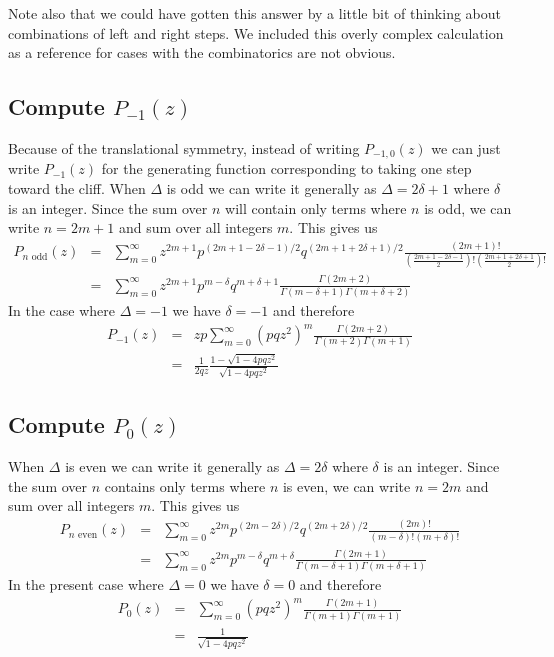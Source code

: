 \documentclass{article}
\begin{document}
Note also that we could have gotten this answer by a little bit of thinking about combinations of left and right steps. We included this overly complex calculation as a reference for cases with the combinatorics are not obvious.

\subsection{Compute $P_{-1}(z)$}

Because of the translational symmetry, instead of writing $P_{-1,0}(z)$ we can just write $P_{-1}(z)$ for the generating function corresponding to taking one step toward the cliff. When $\Delta$ is odd we can write it generally as $\Delta=2\delta+1$ where $\delta$ is an integer. Since the sum over $n$ will contain only terms where $n$ is odd, we can write $n=2m+1$ and sum over all integers $m$. This gives us\begin{eqnarray*}
P_{n\textrm{ odd}}(z) & = & \sum_{m=0}^{\infty}z^{2m+1}p^{(2m+1-2\delta-1)/2}q^{(2m+1+2\delta+1)/2}\frac{(2m+1)!}{\left(\frac{2m+1-2\delta-1}{2}\right)!\left(\frac{2m+1+2\delta+1}{2}\right)!}\\
 & = & \sum_{m=0}^{\infty}z^{2m+1}p^{m-\delta}q^{m+\delta+1}\frac{\Gamma(2m+2)}{\Gamma(m-\delta+1)\Gamma(m+\delta+2)}\end{eqnarray*}
In the case where $\Delta=-1$ we have $\delta=-1$ and therefore\begin{eqnarray*}
P_{-1}(z) & = & zp\sum_{m=0}^{\infty}\left(pqz^{2}\right)^{m}\frac{\Gamma(2m+2)}{\Gamma(m+2)\Gamma(m+1)}\\
 & = & \frac{1}{2qz}\frac{1-\sqrt{1-4pqz^{2}}}{\sqrt{1-4pqz^{2}}}\end{eqnarray*}

\subsection{Compute $P_{0}(z)$}

When $\Delta$ is even we can write it generally as $\Delta=2\delta$
where $\delta$ is an integer. Since the sum over $n$ contains only
terms where $n$ is even, we can write $n=2m$ and sum over all integers
$m$. This gives us\begin{eqnarray*}
P_{n\textrm{ even}}(z) & = & \sum_{m=0}^{\infty}z^{2m}p^{(2m-2\delta)/2}q^{(2m+2\delta)/2}\frac{(2m)!}{(m-\delta)!(m+\delta)!}\\
 & = & \sum_{m=0}^{\infty}z^{2m}p^{m-\delta}q^{m+\delta}\frac{\Gamma(2m+1)}{\Gamma(m-\delta+1)\Gamma(m+\delta+1)}\end{eqnarray*}
In the present case where $\Delta=0$ we have $\delta=0$ and therefore\begin{eqnarray*}
P_{0}(z) & = & \sum_{m=0}^{\infty}(pqz^{2})^{m}\frac{\Gamma(2m+1)}{\Gamma(m+1)\Gamma(m+1)}\\
 & = & \frac{1}{\sqrt{1-4pqz^{2}}}\end{eqnarray*}
\end{document}
